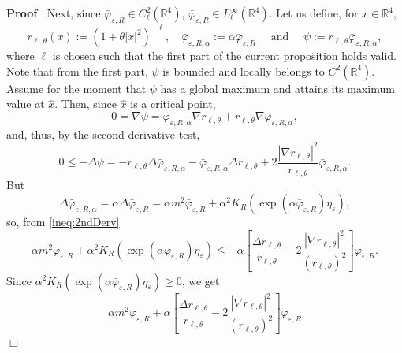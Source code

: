 \documentclass{article}
\newcommand{\assign}{:=}
\newcommand{\infixand}{\text{ and }}
\newenvironment{proof}{\noindent\textbf{Proof\ }}{\hspace*{\fill}$\Box$\medskip}
\begin{document}
\begin{proof}
  Next, since $\bar{\varphi}_{\varepsilon, R} \in C_{\ell}^2
  (\mathbb{R}^4)$, $\bar{\varphi}_{\varepsilon, R} \in L_{\ell}^{\infty}
  (\mathbb{R}^4)$. Let us define, for $x \in \mathbb{R}^4$,
  \[      r_{\ell, \theta} (x) \assign (1 + \theta | x |^2)^{- \ell}, \quad 
       \bar{\varphi}_{\varepsilon, R, \alpha} \assign \alpha
       \bar{\varphi}_{\varepsilon, R} \quad \infixand \quad \psi \assign r_{\ell, \theta}
       \bar{\varphi}_{\varepsilon, R, \alpha},
      \]
  where $\ell$ is chosen such that the first part of the current proposition
  holds valid. Note that from the first part, $\psi$ is bounded and locally
  belongs to $C^2 (\mathbb{R}^4)$. Assume for the moment that $\psi$
  has a global maximum and attains its maximum value at $\hat{x} .$ Then,
  since $\hat{x}$ is a critical point,
  \begin{equation}
      0 = \nabla \psi = \bar{\varphi}_{\varepsilon, R, \alpha} \nabla r_{\ell,
      \theta} + r_{\ell, \theta} \nabla \bar{\varphi}_{\varepsilon, R,
      \alpha}, \label{ineq:1stDerv}
  \end{equation}
  and, thus, by the second derivative test,
  \begin{equation}
      0 \leqslant - \Delta \psi = - r_{\ell, \theta} \Delta
      \bar{\varphi}_{\varepsilon, R, \alpha} - \bar{\varphi}_{\varepsilon, R,
      \alpha} \Delta r_{\ell, \theta} + 2 \frac{| \nabla r_{\ell, \theta}
      |^2}{r_{\ell, \theta}} \bar{\varphi}_{\varepsilon, R, \alpha}. \label{ineq:2ndDerv}
  \end{equation}
  But
  \[ \Delta \bar{\varphi}_{\varepsilon, R, \alpha} = \alpha \Delta
     \bar{\varphi}_{\varepsilon, R} = \alpha m^2 \bar{\varphi}_{\varepsilon,
     R} + \alpha^2 K_R (\exp (\alpha \bar{\varphi}_{\varepsilon, R})
     \eta_{\varepsilon}), \]
  so, from \eqref{ineq:2ndDerv}
  \[ 
       \alpha m^2 \bar{\varphi}_{\varepsilon, R} + \alpha^2 K_R (\exp (\alpha
       \bar{\varphi}_{\varepsilon, R}) \eta_{\varepsilon}) \leqslant - \alpha
       \left[ \frac{\Delta r_{\ell, \theta}}{r_{\ell, \theta}} - 2 \frac{|
       \nabla r_{\ell, \theta} |^2}{(r_{\ell, \theta})^2} \right]
       \bar{\varphi}_{\varepsilon, R} .
      \]
  Since $\alpha^2 K_R (\exp (\alpha \bar{\varphi}_{\varepsilon, R})
  \eta_{\varepsilon}) \geqslant 0$, we get
  \begin{equation}
      \alpha m^2 \bar{\varphi}_{\varepsilon, R} + \alpha \left[ \frac{\Delta
      r_{\ell, \theta}}{r_{\ell, \theta}} - 2 \frac{| \nabla r_{\ell, \theta}
      |^2}{(r_{\ell, \theta})^2} \right] \bar{\varphi}_{\varepsilon, R}

\end{equation}
\end{proof}
\end{document}
